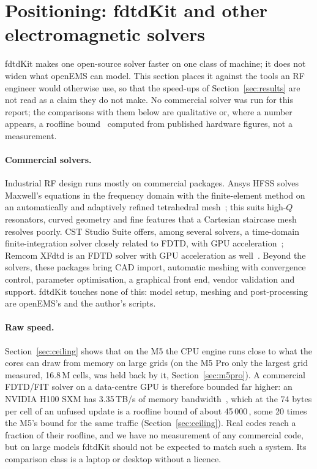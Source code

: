 \section{Positioning: fdtdKit and other electromagnetic solvers}\label{sec:positioning}
fdtdKit makes one open-source solver faster on one class of machine; it does not widen what openEMS can model. This
section places it against the tools an RF engineer would otherwise use, so that the speed-ups of
Section~\ref{sec:results} are not read as a claim they do not make. No commercial solver was run for this report;
the comparisons with them below are qualitative or, where a number appears, a roofline bound~\cite{roofline} computed
from published hardware figures, not a measurement.

\paragraph{Commercial solvers.} Industrial RF design runs mostly on commercial packages. Ansys HFSS solves
Maxwell's equations in the frequency domain with the finite-element method on an automatically and adaptively
refined tetrahedral mesh~\cite{hfssmesh}; this suits high-$Q$ resonators, curved geometry and fine features that a
Cartesian staircase mesh resolves poorly. CST Studio Suite offers, among several solvers, a time-domain
finite-integration solver closely related to FDTD, with GPU acceleration~\cite{cstgpu}; Remcom XFdtd is an FDTD
solver with GPU acceleration as well~\cite{xfdtd}. Beyond the solvers, these packages bring CAD import, automatic
meshing with convergence control, parameter optimisation, a graphical front end, vendor validation and support.
fdtdKit touches none of this: model setup, meshing and post-processing are openEMS's and the author's scripts.

\paragraph{Raw speed.} Section~\ref{sec:ceiling} shows that on the M5 the CPU engine runs close to what the cores can draw from
memory on large grids (on the M5 Pro only the largest grid measured, 16.8\,M cells, was held back by it, Section~\ref{sec:m5pro}). A commercial FDTD/FIT solver on a data-centre GPU is therefore bounded far higher: an NVIDIA H100 SXM has
3.35\,TB/s of memory bandwidth~\cite{h100}, which at the 74 bytes per cell of an unfused update is a roofline bound of
about 45\,000\,\MC, some 20 times the M5's bound for the same traffic (Section~\ref{sec:ceiling}). Real codes reach a
fraction of their roofline, and we have no measurement of any commercial code, but on large models fdtdKit should not
be expected to match such a system. Its comparison class is a laptop or desktop without a licence.

